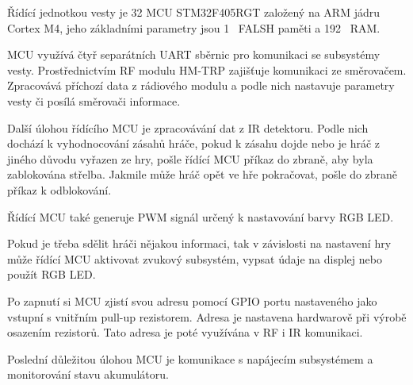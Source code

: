 Řídící jednotkou vesty je 32 MCU STM32F405RGT založený na ARM jádru Cortex M4, jeho základními parametry jsou 1~ FALSH paměti a 192~ RAM.

MCU využívá čtyř separátních UART sběrnic pro komunikaci se subsystémy vesty. Prostřednictvím RF modulu HM-TRP zajišťuje komunikaci ze směrovačem. Zpracovává příchozí data z rádiového modulu a podle nich nastavuje parametry vesty či posílá směrovači informace.

Další úlohou řídícího MCU je zpracovávání dat z IR detektoru. Podle nich dochází k vyhodnocování zásahů hráče, pokud k zásahu dojde nebo je hráč z jiného důvodu vyřazen ze hry, pošle řídící MCU příkaz do zbraně, aby byla zablokována střelba. Jakmile může hráč opět ve hře pokračovat, pošle do zbraně příkaz k odblokování.

Řídící MCU také generuje PWM signál určený k nastavování barvy RGB LED.

Pokud je třeba sdělit hráči nějakou informaci, tak v závislosti na nastavení hry může řídící MCU aktivovat zvukový subsystém, vypsat údaje na displej nebo použít RGB LED.

Po zapnutí si MCU zjistí svou adresu pomocí GPIO portu nastaveného jako vstupní s vnitřním pull-up rezistorem. Adresa je nastavena hardwarově při výrobě osazením rezistorů. Tato adresa je poté využívána v RF i IR komunikaci.

Poslední důležitou úlohou MCU je komunikace s napájecím subsystémem a monitorování stavu akumulátoru.


